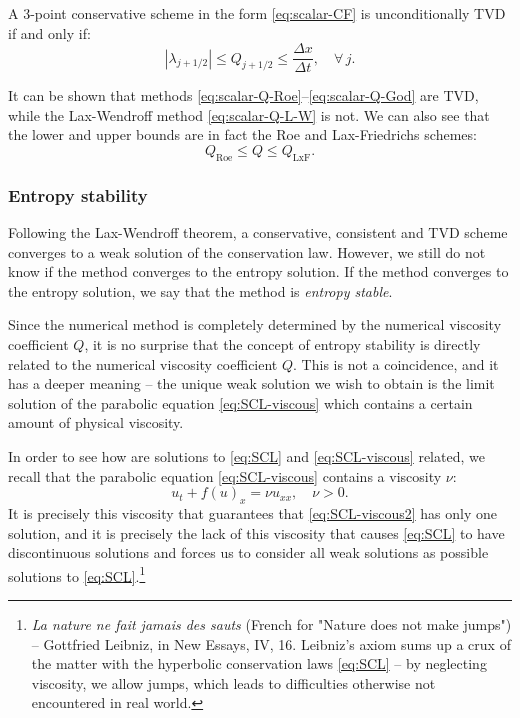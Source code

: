 \begin{theorem} \label{the:3-NV-TVD}
A 3-point conservative scheme in the form \eqref{eq:scalar-CF} is unconditionally TVD if and only if:
\begin{equation} \label{eq:3-NV-TVD}
\left| \lambda_{j+1/2} \right| \leq Q_{j+1/2} \leq \frac{\Delta x}{\Delta t}, \quad \forall \, j.
\end{equation}
\end{theorem}
It can be shown that methods \eqref{eq:scalar-Q-Roe}--\eqref{eq:scalar-Q-God} are TVD, while the Lax-Wendroff method \eqref{eq:scalar-Q-L-W} is not. We can also see that the lower and upper bounds are in fact the Roe and Lax-Friedrichs schemes:
\begin{equation}
Q_\text{Roe} \leq Q \leq Q_\text{LxF}.
\end{equation}

\subsubsection*{Entropy stability}

Following the Lax-Wendroff theorem, a conservative, consistent and TVD scheme converges to a weak solution of the conservation law. However, we still do not know if the method converges to the entropy solution. If the method converges to the entropy solution, we say that the method is \textit{entropy stable}.

Since the numerical method is completely determined by the numerical viscosity coefficient $ Q $, it is no surprise that the concept of entropy stability is directly related to the numerical viscosity coefficient $ Q $. This is not a coincidence, and it has a deeper meaning -- the unique weak solution we wish to obtain is the limit solution of the parabolic equation \eqref{eq:SCL-viscous} which contains a certain amount of physical viscosity.

In order to see how are solutions to \eqref{eq:SCL} and \eqref{eq:SCL-viscous} related, we recall that the parabolic equation \eqref{eq:SCL-viscous} contains a viscosity $ \nu $:
\begin{equation} \label{eq:SCL-viscous2}
u_t + f(u)_x = \nu u_{xx}, \quad \nu > 0.
\end{equation}
It is precisely this viscosity that guarantees that \eqref{eq:SCL-viscous2} has only one solution, and it is precisely the lack of this viscosity that causes \eqref{eq:SCL} to have discontinuous solutions and forces us to consider all weak solutions as possible solutions to \eqref{eq:SCL}.\footnote{\textit{La nature ne fait jamais des sauts} (French for "Nature does not make jumps") -- Gottfried Leibniz, in New Essays, IV, 16. Leibniz's axiom sums up a crux of the matter with the hyperbolic conservation laws \eqref{eq:SCL} -- by neglecting viscosity, we allow jumps, which leads to difficulties otherwise not encountered in real world.}

